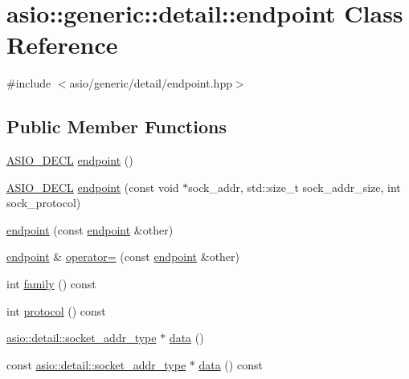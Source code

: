 \hypertarget{classasio_1_1generic_1_1detail_1_1endpoint}{}\section{asio\+:\+:generic\+:\+:detail\+:\+:endpoint Class Reference}
\label{classasio_1_1generic_1_1detail_1_1endpoint}


{\ttfamily \#include $<$asio/generic/detail/endpoint.\+hpp$>$}

\subsection*{Public Member Functions}
\begin{DoxyCompactItemize}
\item 
\hyperlink{config_8hpp_ab54d01ea04afeb9a8b39cfac467656b7}{A\+S\+I\+O\+\_\+\+D\+E\+C\+L} \hyperlink{classasio_1_1generic_1_1detail_1_1endpoint_ac9e985f6a6d064dd86cfb3555dee811f}{endpoint} ()
\item 
\hyperlink{config_8hpp_ab54d01ea04afeb9a8b39cfac467656b7}{A\+S\+I\+O\+\_\+\+D\+E\+C\+L} \hyperlink{classasio_1_1generic_1_1detail_1_1endpoint_aad96c406d63269810534acb15c3d12ca}{endpoint} (const void $\ast$sock\+\_\+addr, std\+::size\+\_\+t sock\+\_\+addr\+\_\+size, int sock\+\_\+protocol)
\item 
\hyperlink{classasio_1_1generic_1_1detail_1_1endpoint_a405e315b9d34174c7f386c441bd003f4}{endpoint} (const \hyperlink{classasio_1_1generic_1_1detail_1_1endpoint}{endpoint} \&other)
\item 
\hyperlink{classasio_1_1generic_1_1detail_1_1endpoint}{endpoint} \& \hyperlink{classasio_1_1generic_1_1detail_1_1endpoint_a9ac9a114732c7da860e4207603de6153}{operator=} (const \hyperlink{classasio_1_1generic_1_1detail_1_1endpoint}{endpoint} \&other)
\item 
int \hyperlink{classasio_1_1generic_1_1detail_1_1endpoint_a02c33007176dc7b5707a604869d1b0de}{family} () const 
\item 
int \hyperlink{classasio_1_1generic_1_1detail_1_1endpoint_a34f191b801aad6293f1bbecaceb7026f}{protocol} () const 
\item 
\hyperlink{namespaceasio_1_1detail_a40a7b0385a38f87815ffbb8df5e34d05}{asio\+::detail\+::socket\+\_\+addr\+\_\+type} $\ast$ \hyperlink{classasio_1_1generic_1_1detail_1_1endpoint_a59187291b7f985db438de54284dbbf72}{data} ()
\item 
const \hyperlink{namespaceasio_1_1detail_a40a7b0385a38f87815ffbb8df5e34d05}{asio\+::detail\+::socket\+\_\+addr\+\_\+type} $\ast$ \hyperlink{classasio_1_1generic_1_1detail_1_1endpoint_aeb7c32d27b2c770d3452691276dc648e}{data} () const 

\end{DoxyCompactItemize}
